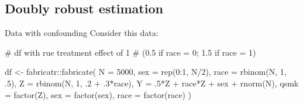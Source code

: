 \documentclass[
  11pt,
  ignorenonframetext,
]{beamer}
\newenvironment{Shaded}{\begin{snugshade}}{\end{snugshade}}
\newcommand{\AttributeTok}[1]{\textcolor[rgb]{0.40,0.45,0.13}{#1}}
\newcommand{\CommentTok}[1]{\textcolor[rgb]{0.37,0.37,0.37}{#1}}
\newcommand{\DecValTok}[1]{\textcolor[rgb]{0.68,0.00,0.00}{#1}}
\newcommand{\FunctionTok}[1]{\textcolor[rgb]{0.28,0.35,0.67}{#1}}
\newcommand{\NormalTok}[1]{\textcolor[rgb]{0.00,0.23,0.31}{#1}}
\newcommand{\OtherTok}[1]{\textcolor[rgb]{0.00,0.23,0.31}{#1}}
\newcommand{\SpecialCharTok}[1]{\textcolor[rgb]{0.37,0.37,0.37}{#1}}
\begin{document}
\hypertarget{doubly-robust-estimation}{%
\subsection{Doubly robust estimation}\label{doubly-robust-estimation}}

\begin{frame}[fragile]{Data with confounding}
\protect\hypertarget{data-with-confounding}{}
Consider this data:

\begin{Shaded}
\begin{Highlighting}[]
\CommentTok{\# df with rue treatment effect of 1 }
\CommentTok{\# (0.5 if race = 0; 1.5 if race = 1)}

\NormalTok{df }\OtherTok{\textless{}{-}}\NormalTok{ fabricatr}\SpecialCharTok{::}\FunctionTok{fabricate}\NormalTok{(}
  \AttributeTok{N =} \DecValTok{5000}\NormalTok{,}
  \AttributeTok{sex =} \FunctionTok{rep}\NormalTok{(}\DecValTok{0}\SpecialCharTok{:}\DecValTok{1}\NormalTok{, N}\SpecialCharTok{/}\DecValTok{2}\NormalTok{),}
  \AttributeTok{race =} \FunctionTok{rbinom}\NormalTok{(N, }\DecValTok{1}\NormalTok{, .}\DecValTok{5}\NormalTok{),}
  \AttributeTok{Z =} \FunctionTok{rbinom}\NormalTok{(N, }\DecValTok{1}\NormalTok{, .}\DecValTok{2} \SpecialCharTok{+}\NormalTok{ .}\DecValTok{3}\SpecialCharTok{*}\NormalTok{race),}
  \AttributeTok{Y =}\NormalTok{ .}\DecValTok{5}\SpecialCharTok{*}\NormalTok{Z }\SpecialCharTok{+}\NormalTok{ race}\SpecialCharTok{*}\NormalTok{Z }\SpecialCharTok{+}\NormalTok{ sex }\SpecialCharTok{+} \FunctionTok{rnorm}\NormalTok{(N),}
  \AttributeTok{qsmk =} \FunctionTok{factor}\NormalTok{(Z),}
  \AttributeTok{sex =} \FunctionTok{factor}\NormalTok{(sex),}
  \AttributeTok{race =} \FunctionTok{factor}\NormalTok{(race)}
\NormalTok{)}
\end{Highlighting}
\end{Shaded}
\end{frame}
\end{document}

